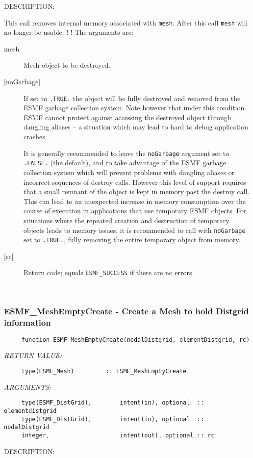 {\sf DESCRIPTION:\\ }


    This call removes internal memory associated with {\tt mesh}.
    After this call {\tt mesh} will no longer be usable.
  !
  ! The arguments are:
   \begin{description}
   \item [mesh]
   Mesh object to be destroyed.
   \item[{[noGarbage]}]
        If set to {\tt .TRUE.} the object will be fully destroyed and removed
        from the ESMF garbage collection system. Note however that under this 
        condition ESMF cannot protect against accessing the destroyed object 
        through dangling aliases -- a situation which may lead to hard to debug 
        application crashes.
   
        It is generally recommended to leave the {\tt noGarbage} argument
        set to {\tt .FALSE.} (the default), and to take advantage of the ESMF 
        garbage collection system which will prevent problems with dangling
        aliases or incorrect sequences of destroy calls. However this level of
        support requires that a small remnant of the object is kept in memory
        past the destroy call. This can lead to an unexpected increase in memory
        consumption over the course of execution in applications that use 
        temporary ESMF objects. For situations where the repeated creation and 
        destruction of temporary objects leads to memory issues, it is 
        recommended to call with {\tt noGarbage} set to {\tt .TRUE.}, fully 
        removing the entire temporary object from memory.
   \item [{[rc]}]
           Return code; equals {\tt ESMF\_SUCCESS} if there are no errors.
   \end{description}
   
 
\mbox{}\hrulefill\ 
 
\subsubsection [ESMF\_MeshEmptyCreate] {ESMF\_MeshEmptyCreate - Create a Mesh to hold Distgrid information}


  
\begin{verbatim}     function ESMF_MeshEmptyCreate(nodalDistgrid, elementDistgrid, rc)\end{verbatim}{\em RETURN VALUE:}
\begin{verbatim}     type(ESMF_Mesh)         :: ESMF_MeshEmptyCreate\end{verbatim}{\em ARGUMENTS:}
\begin{verbatim}     type(ESMF_DistGrid),        intent(in), optional  :: elementdistgrid
     type(ESMF_DistGrid),        intent(in), optional  :: nodalDistgrid
     integer,                    intent(out), optional :: rc
 \end{verbatim}
{\sf DESCRIPTION:\\ }


